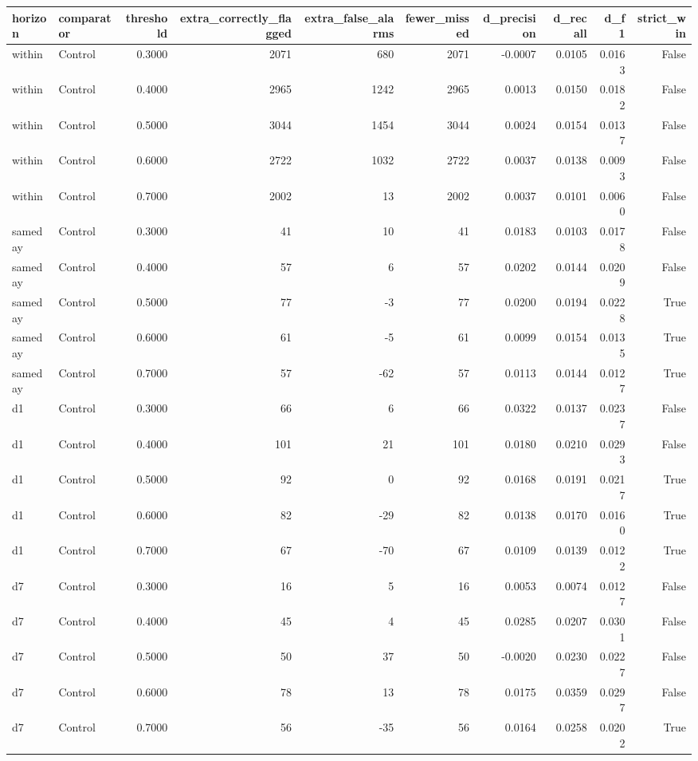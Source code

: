 \begin{tabular}{llrrrrrrrr}
\toprule
horizon & comparator & threshold & extra\_correctly\_flagged & extra\_false\_alarms & fewer\_missed & d\_precision & d\_recall & d\_f1 & strict\_win \\
\midrule
within & Control & 0.3000 & 2071 & 680 & 2071 & -0.0007 & 0.0105 & 0.0163 & False \\
within & Control & 0.4000 & 2965 & 1242 & 2965 & 0.0013 & 0.0150 & 0.0182 & False \\
within & Control & 0.5000 & 3044 & 1454 & 3044 & 0.0024 & 0.0154 & 0.0137 & False \\
within & Control & 0.6000 & 2722 & 1032 & 2722 & 0.0037 & 0.0138 & 0.0093 & False \\
within & Control & 0.7000 & 2002 & 13 & 2002 & 0.0037 & 0.0101 & 0.0060 & False \\
sameday & Control & 0.3000 & 41 & 10 & 41 & 0.0183 & 0.0103 & 0.0178 & False \\
sameday & Control & 0.4000 & 57 & 6 & 57 & 0.0202 & 0.0144 & 0.0209 & False \\
sameday & Control & 0.5000 & 77 & -3 & 77 & 0.0200 & 0.0194 & 0.0228 & True \\
sameday & Control & 0.6000 & 61 & -5 & 61 & 0.0099 & 0.0154 & 0.0135 & True \\
sameday & Control & 0.7000 & 57 & -62 & 57 & 0.0113 & 0.0144 & 0.0127 & True \\
d1 & Control & 0.3000 & 66 & 6 & 66 & 0.0322 & 0.0137 & 0.0237 & False \\
d1 & Control & 0.4000 & 101 & 21 & 101 & 0.0180 & 0.0210 & 0.0293 & False \\
d1 & Control & 0.5000 & 92 & 0 & 92 & 0.0168 & 0.0191 & 0.0217 & True \\
d1 & Control & 0.6000 & 82 & -29 & 82 & 0.0138 & 0.0170 & 0.0160 & True \\
d1 & Control & 0.7000 & 67 & -70 & 67 & 0.0109 & 0.0139 & 0.0122 & True \\
d7 & Control & 0.3000 & 16 & 5 & 16 & 0.0053 & 0.0074 & 0.0127 & False \\
d7 & Control & 0.4000 & 45 & 4 & 45 & 0.0285 & 0.0207 & 0.0301 & False \\
d7 & Control & 0.5000 & 50 & 37 & 50 & -0.0020 & 0.0230 & 0.0227 & False \\
d7 & Control & 0.6000 & 78 & 13 & 78 & 0.0175 & 0.0359 & 0.0297 & False \\
d7 & Control & 0.7000 & 56 & -35 & 56 & 0.0164 & 0.0258 & 0.0202 & True \\

\end{tabular}
